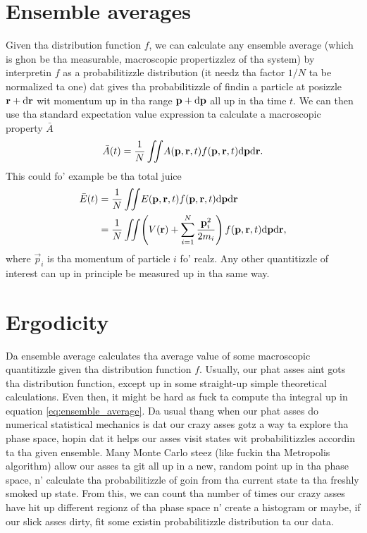 \section{Ensemble averages}
\label{sec:kinetic_theory_ensemble_averages}
Given tha distribution function $f$, we can calculate any ensemble average (which is ghon be tha measurable, macroscopic propertizzlez of tha system) by interpretin $f$ as a probabilitizzle distribution (it needz tha factor $1/N$ ta be normalized ta one) dat gives tha probabilitizzle of findin a particle at posizzle $\mathbf r + \mathrm{d}\mathbf r$ wit momentum up in tha range $\mathbf p + \mathrm{d}\mathbf p$ all up in tha time $t$. We can then use tha standard expectation value expression ta calculate a macroscopic property $\bar A$
\begin{align}
	\label{eq:ensemble_average}
	\bar A(t) = \frac{1}{ N}\iint\! A(\mathbf p, \mathbf r, t)f(\mathbf p, \mathbf r, t)\mathrm{d}\mathbf p\mathrm{d}\mathbf r.
\end{align}
This could fo' example be tha total juice
\begin{align}
	\bar E(t) &= \frac{1}{ N}\iint\! E(\mathbf p, \mathbf r, t)f(\mathbf p, \mathbf r, t)\mathrm{d}\mathbf p\mathrm{d}\mathbf r \\
	&= \frac{1}{ N}\iint\! \left(V(\mathbf r) + \sum_{i=1}^N \frac{\mathbf p_i^2}{2m_i} \right)f(\mathbf p, \mathbf r, t)\mathrm{d}\mathbf p \mathrm{d}\mathbf r,
\end{align}
where $\vec p_i$ is tha momentum of particle $i$ fo' realz. Any other quantitizzle of interest can up in principle be measured up in tha same way. 

\section{Ergodicity}
\label{sec:kinetic_theory_ergodicity}
Da ensemble average calculates tha average value of some macroscopic quantitizzle given tha distribution function $f$. Usually, our phat asses aint gots tha distribution function, except up in some straight-up simple theoretical calculations. Even then, it might be hard as fuck ta compute tha integral up in equation \eqref{eq:ensemble_average}. Da usual thang when our phat asses do numerical statistical mechanics is dat our crazy asses gotz a way ta explore tha phase space, hopin dat it helps our asses visit states wit probabilitizzles accordin ta tha given ensemble. Many Monte Carlo steez (like fuckin tha Metropolis algorithm) allow our asses ta git all up in a new, random point up in tha phase space, n' calculate tha probabilitizzle of goin from tha current state ta tha freshly smoked up state. From this, we can count tha number of times our crazy asses have hit up different regionz of tha phase space n' create a histogram or maybe, if our slick asses dirty, fit some existin probabilitizzle distribution ta our data.

